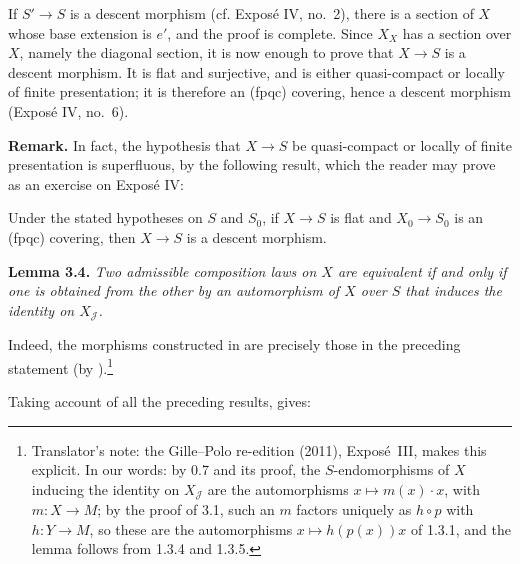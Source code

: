 If \(S'\to S\) is a descent morphism (cf. Expos\'e IV, no.~2), there is
a section of \(X\) whose base extension is \(e'\), and the proof is
complete. Since \(X_X\) has a section over \(X\), namely the diagonal
section, it is now enough to prove that \(X\to S\) is a descent
morphism. It is flat and surjective, and is either quasi-compact or
locally of finite presentation; it is therefore an (fpqc) covering,
hence a descent morphism (Expos\'e IV, no.~6).

\medskip
\noindent\textbf{Remark.}
In fact, the hypothesis that \(X\to S\) be quasi-compact or locally of
finite presentation is superfluous, by the following result, which the
reader may prove as an exercise on Expos\'e IV:

Under the stated hypotheses on \(S\) and \(S_0\), if \(X\to S\) is
flat and \(X_0\to S_0\) is an (fpqc) covering, then \(X\to S\) is a
descent morphism.

\medskip
\noindent{}\textbf{Lemma 3.4.}
\textit{Two admissible composition laws on \(X\) are equivalent if and
only if one is obtained from the other by an
automorphism of \(X\) over \(S\) that induces the identity on
\(X_{\mathscr J}\).}

Indeed, the morphisms constructed in  are precisely those in the
preceding statement (by ).\footnote{Translator's note: the Gille--Polo re-edition (2011), Exposé~III, makes
this explicit. In our words: by 0.7 and its proof, the \(S\)-endomorphisms of
\(X\) inducing the identity on \(X_{\mathscr J}\) are the automorphisms
\(x\mapsto m(x)\cdot x\), with \(m\colon X\to M\); by the proof of 3.1, such an
\(m\) factors uniquely as \(h\circ p\) with \(h\colon Y\to M\), so these are
the automorphisms \(x\mapsto h(p(x))x\) of 1.3.1, and the lemma follows from
1.3.4 and 1.3.5.}

Taking account of all the preceding results,  gives:

